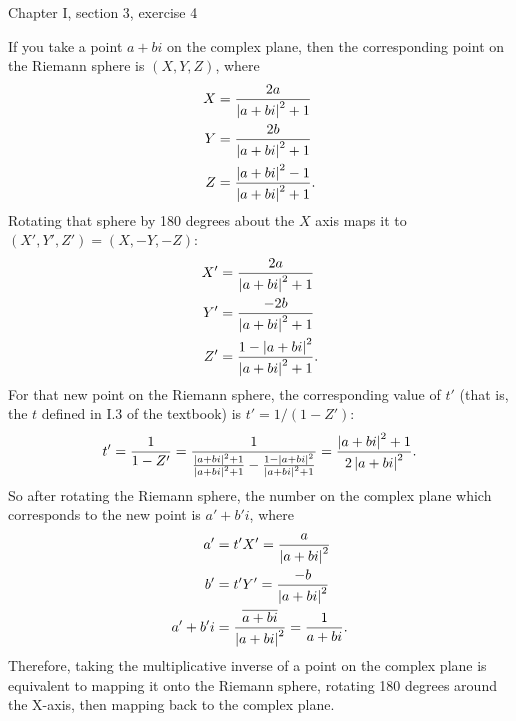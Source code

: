 \documentclass{article}
\begin{document}
\bigskip
\par
\begin{prob}
    Chapter I, section 3, exercise 4
\end{prob}
If you take a point $a+bi$ on the complex plane, then the corresponding point on the Riemann sphere is $(X, Y, Z)$, where
\begin{align*}
    X &= \frac{2a}{\left\lvert a+bi \right\rvert^2+1} \\
    Y &= \frac{2b}{\left\lvert a+bi \right\rvert^2+1} \\
    Z &= \frac{\left\lvert a+bi \right\rvert^2-1}{\left\lvert a+bi \right\rvert^2+1}.
\end{align*}
Rotating that sphere by 180 degrees about the $X$ axis maps it to $(X', Y', Z') = (X, -Y, -Z)$:
\begin{align*}
    X' &= \frac{2a}{\left\lvert a+bi \right\rvert^2+1} \\
    Y' &= \frac{-2b}{\left\lvert a+bi \right\rvert^2+1} \\
    Z' &= \frac{1-\left\lvert a+bi \right\rvert^2}{\left\lvert a+bi \right\rvert^2+1}.
\end{align*}
For that new point on the Riemann sphere, the corresponding value of $t'$ (that is, the $t$ defined in I.3 of the textbook) is $t'=1/(1-Z')$:
\[ t' = \frac{1}{1-Z'} = \frac{1}{ \frac{\left\lvert a+bi \right\rvert^2+1}{\left\lvert a+bi \right\rvert^2+1} - \frac{1-\left\lvert a+bi \right\rvert^2}{\left\lvert a+bi \right\rvert^2+1}} = \frac{\left\lvert a+bi \right\rvert^2+1}{2\left\lvert a+bi \right\rvert^2}. \]
So after rotating the Riemann sphere, the number on the complex plane which corresponds to the new point is $a'+b'i$, where
\begin{align*}
    a' &= t'X' = \frac{a}{\left\lvert a+bi \right\rvert^2} \\
    b' &= t'Y' = \frac{-b}{\left\lvert a+bi \right\rvert^2} \\
    a'+b'i &= \frac{\overline{a+bi}}{\left\lvert a+bi \right\rvert^2} = \frac{1}{a+bi}.
\end{align*}
Therefore, taking the multiplicative inverse of a point on the complex plane is equivalent to mapping it onto the Riemann sphere, rotating 180 degrees around the X-axis, then mapping back to the complex plane.
\end{document}
